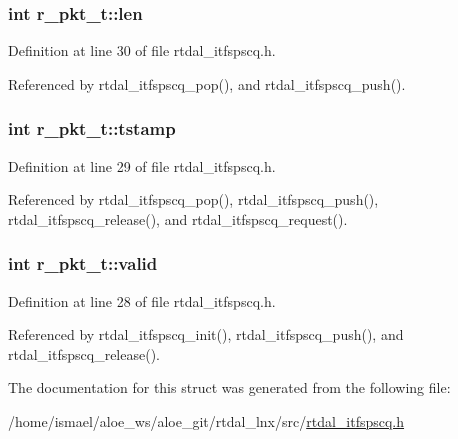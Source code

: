 \hypertarget{structr__pkt__t_a9c23f94deac4bfb5f8584afcdd107f8a}{
\subsubsection[{len}]{\setlength{\rightskip}{0pt plus 5cm}int r\-\_\-pkt\-\_\-t\-::len}}\label{structr__pkt__t_a9c23f94deac4bfb5f8584afcdd107f8a}


Definition at line 30 of file rtdal\-\_\-itfspscq.\-h.



Referenced by rtdal\-\_\-itfspscq\-\_\-pop(), and rtdal\-\_\-itfspscq\-\_\-push().

\hypertarget{structr__pkt__t_a0d4ff9e1354844e0d83eb14ebad1b309}{
\subsubsection[{tstamp}]{\setlength{\rightskip}{0pt plus 5cm}int r\-\_\-pkt\-\_\-t\-::tstamp}}\label{structr__pkt__t_a0d4ff9e1354844e0d83eb14ebad1b309}


Definition at line 29 of file rtdal\-\_\-itfspscq.\-h.



Referenced by rtdal\-\_\-itfspscq\-\_\-pop(), rtdal\-\_\-itfspscq\-\_\-push(), rtdal\-\_\-itfspscq\-\_\-release(), and rtdal\-\_\-itfspscq\-\_\-request().

\hypertarget{structr__pkt__t_a22af5ea9cd0dc91928651e046400dc51}{
\subsubsection[{valid}]{\setlength{\rightskip}{0pt plus 5cm}int r\-\_\-pkt\-\_\-t\-::valid}}\label{structr__pkt__t_a22af5ea9cd0dc91928651e046400dc51}


Definition at line 28 of file rtdal\-\_\-itfspscq.\-h.



Referenced by rtdal\-\_\-itfspscq\-\_\-init(), rtdal\-\_\-itfspscq\-\_\-push(), and rtdal\-\_\-itfspscq\-\_\-release().



The documentation for this struct was generated from the following file\-:\begin{DoxyCompactItemize}
\item 
/home/ismael/aloe\-\_\-ws/aloe\-\_\-git/rtdal\-\_\-lnx/src/\hyperlink{rtdal__itfspscq_8h}{rtdal\-\_\-itfspscq.\-h}\end{DoxyCompactItemize}
